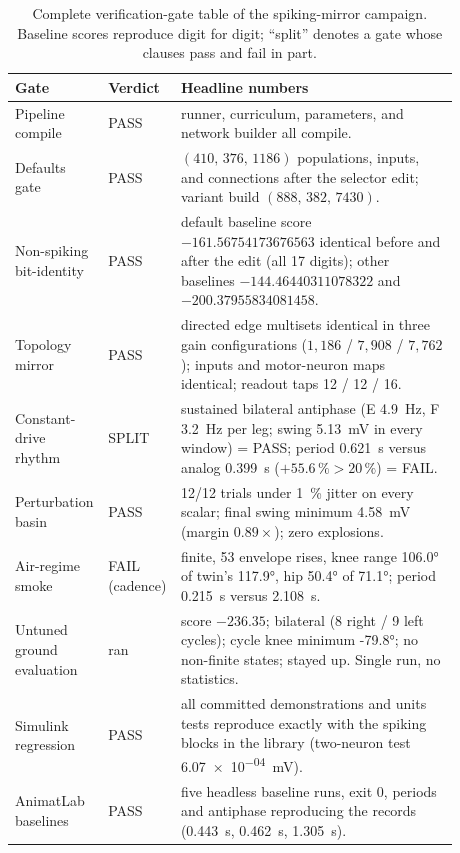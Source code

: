 \begin{table}
\caption{Complete verification-gate table of the spiking-mirror campaign. Baseline scores reproduce digit for digit; ``split'' denotes a gate whose clauses pass and fail in part.}
\label{tab:app_spk_gates}
\begin{tabular}{@{}p{0.16\linewidth}p{0.10\linewidth}p{0.62\linewidth}@{}}
\toprule
\textbf{Gate} & \textbf{Verdict} & \textbf{Headline numbers} \\
\midrule
Pipeline compile & PASS & runner, curriculum, parameters, and network builder all compile. \\
Defaults gate & PASS & $(410,\,376,\,1186)$ populations, inputs, and connections after the selector edit; variant build $(888,\,382,\,7430)$. \\
Non-spiking bit-identity & PASS & default baseline score $-161.56754173676563$ identical before and after the edit (all 17 digits); other baselines $-144.46440311078322$ and $-200.37955834081458$. \\
Topology mirror & PASS & directed edge multisets identical in three gain configurations ($1{,}186$ / $7{,}908$ / $7{,}762$); inputs and motor-neuron maps identical; readout taps 12 / 12 / 16. \\
Constant-drive rhythm & SPLIT & sustained bilateral antiphase (E \qty{4.9}{\hertz}, F \qty{3.2}{\hertz} per leg; swing \qty{5.13}{\mV} in every window) = PASS; period \qty{0.621}{\second} versus analog \qty{0.399}{\second} ($+55.6\,\% > 20\,\%$) = FAIL. \\
Perturbation basin & PASS & 12/12 trials under \qty{1}{\percent} jitter on every scalar; final swing minimum \qty{4.58}{\mV} (margin $0.89\times$); zero explosions. \\
Air-regime smoke & FAIL (cadence) & finite, 53 envelope rises, knee range \ang{106.0} of twin's \ang{117.9}, hip \ang{50.4} of \ang{71.1}; period \qty{0.215}{\second} versus \qty{2.108}{\second}. \\
Untuned ground evaluation & ran & score $-236.35$; bilateral (8 right / 9 left cycles); cycle knee minimum \ang{-79.8}; no non-finite states; stayed up. Single run, no statistics. \\
Simulink regression & PASS & all committed demonstrations and units tests reproduce exactly with the spiking blocks in the library (two-neuron test \qty{6.07e-04}{\mV}). \\
AnimatLab baselines & PASS & five headless baseline runs, exit 0, periods and antiphase reproducing the records (\qty{0.443}{\second}, \qty{0.462}{\second}, \qty{1.305}{\second}). \\
\bottomrule
\end{tabular}
\end{table}

